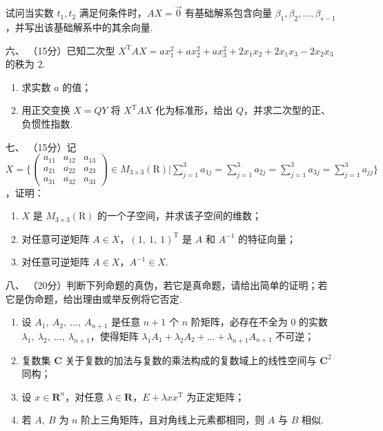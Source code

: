 \begin{enumerate}
    试问当实数 $t_1,t_2$ 满足何条件时，$AX=\vec{0}$ 有基础解系包含向量 $\beta_1,\beta_2,\ldots,\beta_{s-1}$，并写出该基础解系中的其余向量.
	\item[六、]（15分）已知二次型 $X^{\mathrm{T}}AX=ax_1^2+ax_2^2+ax_3^2+2x_1x_2+2x_1x_3-2x_2x_3$ 的秩为 $2$.
    \begin{enumerate}[label=(\arabic*)]
        \item 求实数 $a$ 的值；
        \item 用正交变换 $X=QY$ 将 $X^{\mathrm{T}}AX$ 化为标准形，给出 $Q$，并求二次型的正、负惯性指数.
    \end{enumerate}
	\item[七、]（15分）记 $X=\Bigg\{\begin{pmatrix}a_{11} & a_{12} & a_{13} \\ a_{21} & a_{22} & a_{23} \\ a_{31} & a_{32} & a_{33}\end{pmatrix} \in M_{3 \times 3}(\mathrm{R}) \Bigg| \sum\limits_{j=1}^3a_{1j}=\sum\limits_{j=1}^3a_{2j}=\sum\limits_{j=1}^3a_{3j}=\sum\limits_{j=1}^3a_{jj}\Bigg\}$，证明：
    \begin{enumerate}[label=(\arabic*)]
        \item $X$ 是 $M_{3 \times 3}(\mathrm{R})$ 的一个子空间，并求该子空间的维数；
        \item 对任意可逆矩阵 $A \in X$，$(1,\ 1,\ 1)^{\mathrm{T}}$ 是 $A$ 和 $A^{-1}$ 的特征向量；
        \item 对任意可逆矩阵 $A \in X$，$A^{-1} \in X$.
    \end{enumerate}
	\item[八、]（20分）判断下列命题的真伪，若它是真命题，请给出简单的证明；若它是伪命题，给出理由或举反例将它否定.
    \begin{enumerate}[label=(\arabic*)]
        \item 设 $A_1,\ A_2,\ \dots,\ A_{n+1}$ 是任意 $n+1$ 个 $n$ 阶矩阵，必存在不全为 $0$ 的实数 $\lambda_1,\ \lambda_2,\ \dots,\ \lambda_{n+1}$，使得矩阵 $\lambda_1A_1+\lambda_2A_2+\dots+\lambda_{n+1}A_{n+1}$ 不可逆；
        \item 复数集 $\mathbf{C}$ 关于复数的加法与复数的乘法构成的复数域上的线性空间与 $\mathbf{C}^2$ 同构；
        \item 设 $x \in \mathbf{R}^n$，对任意 $\lambda \in \mathbf{R}$，$E+\lambda xx^{\mathrm{T}}$ 为正定矩阵；
        \item 若 $A,\ B$ 为 $n$ 阶上三角矩阵，且对角线上元素都相同，则 $A$ 与 $ B$ 相似.
    \end{enumerate}
\end{enumerate}

\clearpage
